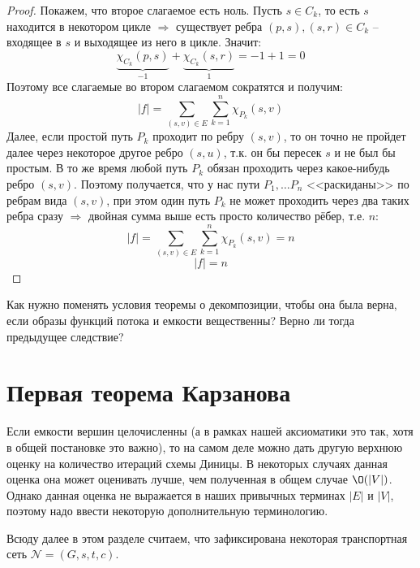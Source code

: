 \begin{proof}
    Покажем, что второе слагаемое есть ноль. Пусть $s \in C_k$, то есть $s$ находится в некотором цикле $\Rightarrow$ существует ребра $(p, s), (s, r) \in C_k$ -- входящее в $s$ и выходящее из него в цикле. Значит:
    \begin{equation*}
        \underbrace{\chi_{C_k} (p, s)}_{-1} + \underbrace{\chi_{C_k} (s, r)}_{1} = -1 + 1 = 0
    \end{equation*}
    Поэтому все слагаемые во втором слагаемом сократятся и получим:
    \begin{equation*}
        |f| = \sum\limits_{(s, v) \in E} \sum\limits_{k = 1}^n \chi_{P_k}(s, v)
    \end{equation*}
    Далее, если простой путь $P_k$ проходит по ребру $(s, v)$, то он точно не пройдет далее через некоторое другое ребро $(s, u)$, т.к. он бы пересек $s$ и не был бы простым. В то же время любой путь $P_k$ обязан проходить через какое-нибудь ребро $(s, v)$.
    Поэтому получается, что у нас пути $P_1, \dots P_n$ <<раскиданы>> по ребрам вида $(s, v)$, при этом один путь $P_k$ не может проходить через два таких ребра сразу $\Rightarrow$ двойная сумма выше есть просто количество рёбер, т.е. $n$:
    \begin{equation*}
        |f| = \sum\limits_{(s, v) \in E} \sum\limits_{k = 1}^n \chi_{P_k}(s, v) = n
    \end{equation*}
    \begin{equation*}
        |f| = n
    \end{equation*}
\end{proof}

\Exe Как нужно поменять условия теоремы о декомпозиции, чтобы она была верна, если образы функций потока и емкости вещественны? Верно ли тогда предыдущее следствие?

\section{Первая теорема Карзанова}
\begingroup

Если емкости вершин целочисленны (а в рамках нашей аксиоматики это так, хотя в общей постановке это важно), то на самом деле можно дать другую верхнюю оценку на количество итераций схемы Диницы.
В некоторых случаях данная оценка она может оценивать лучше, чем полученная в общем случае $\O(|V|)$. Однако данная оценка не выражается в наших привычных терминах $|E|$ и $|V|$, поэтому надо ввести некоторую дополнительную терминологию.

Всюду далее в этом разделе считаем, что зафиксирована некоторая транспортная сеть $\mathcal{N} = (G, s, t, c)$.

